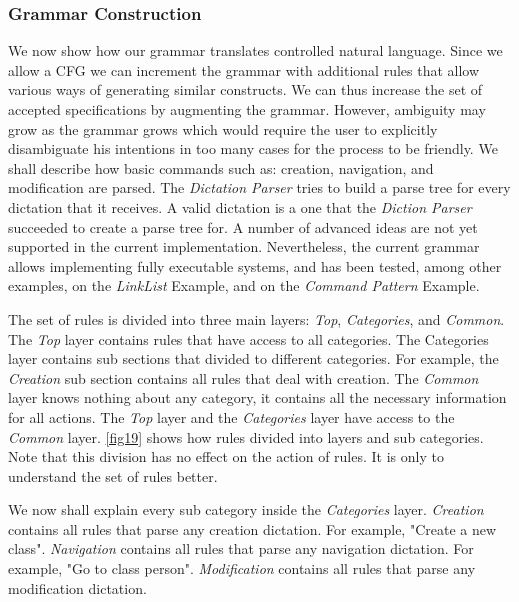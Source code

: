 \subsubsection{Grammar Construction}
We now show how our grammar translates controlled natural language. Since we allow a CFG we can increment the grammar with additional rules that allow various ways of generating similar constructs. We can thus increase the set of accepted specifications by augmenting the grammar. However, ambiguity may grow as the grammar grows which would require the user to explicitly disambiguate his intentions in too many cases for the process to be friendly. We shall describe how basic commands such as: creation, navigation, and modification are parsed. The \textit{Dictation Parser} tries to build a parse tree for every dictation that it receives. A valid dictation is a one that the \textit{Diction Parser} succeeded to create a parse tree for. A number of advanced ideas are not yet supported in the current implementation. Nevertheless, the current grammar allows implementing fully executable systems, and has been tested, among other examples, on the \textit{LinkList} Example, and on the \textit{Command Pattern} Example.

The set of rules is divided into three main layers: \textit{Top}, \textit{Categories}, and \textit{Common}. The \textit{Top} layer contains rules that have access to all categories. The Categories layer contains sub sections that divided to different categories. For example, the \textit{Creation} sub section contains all rules that deal with creation. The \textit{Common} layer knows nothing about any category, it contains all the necessary information for all actions. The \textit{Top} layer and the \textit{Categories} layer have access to the \textit{Common} layer. \ref{fig19} shows how rules divided into layers and sub categories. Note that this division has no effect on the action of rules. It is only to understand the set of rules better.

We now shall explain every sub category inside the \textit{Categories} layer. \textit{Creation} contains all rules that parse any creation dictation. For example, "Create a new class". \textit{Navigation} contains all rules that parse any navigation dictation. For example, "Go to class person". \textit{Modification} contains all rules that parse any modification dictation.

